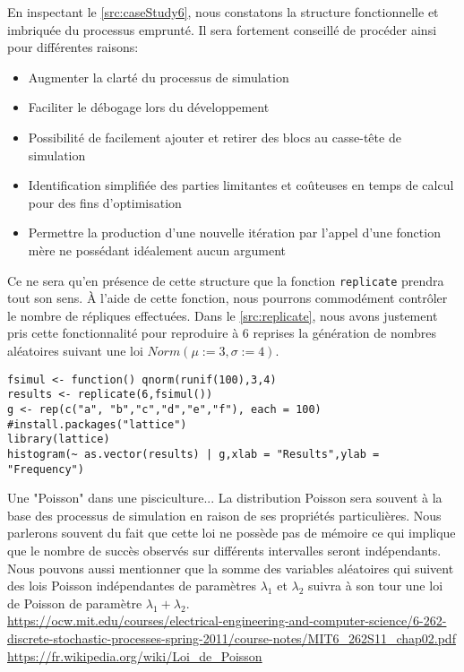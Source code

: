 En inspectant le \autoref{src:caseStudy6}, nous constatons la structure fonctionnelle et imbriquée du processus emprunté. Il sera fortement conseillé de procéder ainsi pour différentes raisons:

\begin{itemize}
	\item Augmenter la clarté du processus de simulation
	\item Faciliter le débogage lors du développement
	\item Possibilité de facilement ajouter et retirer des blocs au casse-tête de simulation
	\item Identification simplifiée des parties limitantes et coûteuses en temps de calcul pour des fins d'optimisation
	\item Permettre la production d'une nouvelle itération par l'appel d'une fonction mère ne possédant idéalement aucun argument
\end{itemize}

Ce ne sera qu'en présence de cette structure que la fonction \texttt{replicate} prendra tout son sens. À l'aide de cette fonction, nous pourrons commodément contrôler le nombre de répliques effectuées. Dans le \autoref{src:replicate}, nous avons justement pris cette fonctionnalité pour reproduire à 6 reprises la génération de nombres aléatoires suivant une loi $Norm(\mu := 3, \sigma := 4)$.

\begin{lstlisting}[caption = Réplication d'une analyse par simulation,label=src:replicate]
fsimul <- function() qnorm(runif(100),3,4)
results <- replicate(6,fsimul())
g <- rep(c("a", "b","c","d","e","f"), each = 100)
#install.packages("lattice")
library(lattice)
histogram(~ as.vector(results) | g,xlab = "Results",ylab = "Frequency") 
\end{lstlisting}


\begin{moreInfo}{Une "Poisson" dans une pisciculture...}
	La distribution Poisson sera souvent à la base des processus de simulation en raison de ses propriétés particulières. Nous parlerons souvent du fait que cette loi ne possède pas de mémoire ce qui implique que le nombre de succès observés sur différents intervalles seront indépendants. Nous pouvons aussi mentionner que la somme des variables aléatoires qui suivent des lois Poisson indépendantes de paramètres $\lambda_1$ et $\lambda_2$ suivra à son tour une loi de Poisson de paramètre $\lambda_1 + \lambda_2$. \\
	\url{https://ocw.mit.edu/courses/electrical-engineering-and-computer-science/6-262-discrete-stochastic-processes-spring-2011/course-notes/MIT6_262S11_chap02.pdf} \\
	\url{https://fr.wikipedia.org/wiki/Loi_de_Poisson}
\end{moreInfo}

